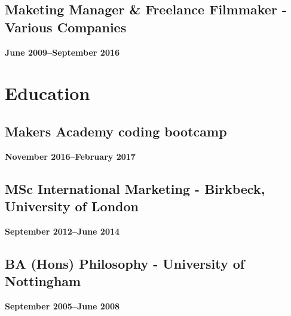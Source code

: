 \documentclass[a4paper]{scrartcl}
\begin{document}
\subsection*{Maketing Manager \& Freelance Filmmaker - Various Companies}
\textbf{June 2009--September 2016}

\section*{Education}

\subsection*{Makers Academy coding bootcamp}
\textbf{November 2016--February 2017}

\subsection*{MSc International Marketing - Birkbeck, University of London}
\textbf{September 2012--June 2014}

\subsection*{BA (Hons) Philosophy - University of Nottingham}
\textbf{September 2005--June 2008}
\end{document}
